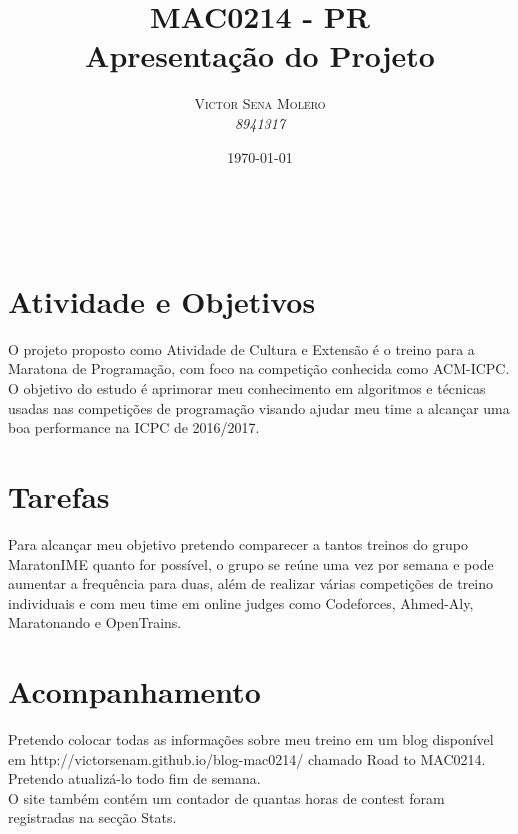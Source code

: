 \documentclass[a4paper, 11pt]{article} %
\title{\textbf{MAC0214 - PR}\\ %
Apresentação do Projeto} %
\author{\textsc{Victor Sena Molero} %
\\{\textit{8941317}}} %
\date{\today} %
\makeatletter
\renewcommand{\maketitle}{ %
\begin{flushright} %
{\LARGE\@title} %

\vspace{50pt} %

{\large\@author} %
\\\@date %

\vspace{40pt} %
\end{flushright}
}
\makeatother
\begin{document}
\maketitle %


\section*{Atividade e Objetivos}

O projeto proposto como Atividade de Cultura e Extensão é o treino para a Maratona de Programação, com foco na competição conhecida como ACM-ICPC. O objetivo do estudo é aprimorar meu conhecimento em algoritmos e técnicas usadas nas competições de programação visando ajudar meu time a alcançar uma boa performance na ICPC de 2016/2017.


\section*{Tarefas}

Para alcançar meu objetivo pretendo comparecer a tantos treinos do grupo MaratonIME quanto for possível, o grupo se reúne uma vez por semana e pode aumentar a frequência para duas, além de realizar várias competições de treino individuais e com meu time em online judges como Codeforces, Ahmed-Aly, Maratonando e OpenTrains.


\section*{Acompanhamento}

Pretendo colocar todas as informações sobre meu treino em um blog disponível em http://victorsenam.github.io/blog-mac0214/ chamado Road to MAC0214. Pretendo atualizá-lo todo fim de semana. \\
O site também contém um contador de quantas horas de contest foram registradas na secção Stats.

\end{document}

